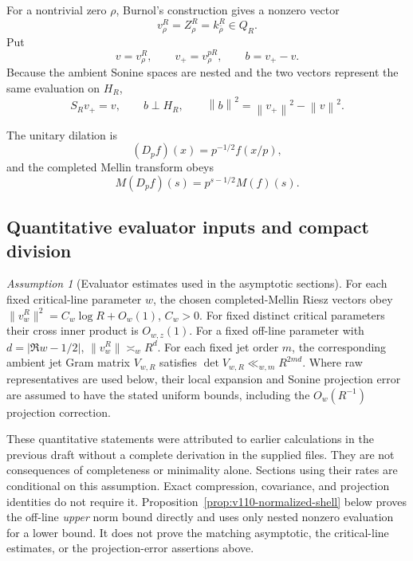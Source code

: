 \documentclass[11pt]{article}
\theoremstyle{remark}
\newcommand{\norm}[1]{\left\lVert #1\right\rVert}
\newtheorem{assumption}[theorem]{Assumption}
\begin{document}
For a nontrivial zero $\rho$, Burnol's construction gives a nonzero vector
\[
 v_\rho^R=Z_\rho^R=k_{\bar\rho}^R\in Q_R.
\]
Put
\[
 v=v_\rho^R,\qquad v_+=v_\rho^{pR},\qquad b=v_+-v.
\]
Because the ambient Sonine spaces are nested and the two vectors represent the same evaluation on $H_R$,
\begin{equation}\label{eq:nested}
 S_Rv_+=v,\qquad b\perp H_R,\qquad
 \norm b^2=\norm{v_+}^2-\norm v^2.
\end{equation}

The unitary dilation is
\[
 (D_pf)(x)=p^{-1/2}f(x/p),
\]
and the completed Mellin transform obeys
\[
 M(D_pf)(s)=p^{s-1/2}M(f)(s).
\]

\subsection*{Quantitative evaluator inputs and compact division}
\begin{assumption}[Evaluator estimates used in the asymptotic sections]\label{ass:evaluators}
For each fixed critical-line parameter $w$, the chosen completed-Mellin
Riesz vectors obey $\|v_w^R\|^2=C_w\log R+O_w(1)$, $C_w>0$.
For fixed distinct critical parameters their cross inner product is
$O_{w,z}(1)$. For a fixed off-line parameter with
$d=|\Re w-1/2|$, $\|v_w^R\|\asymp_w R^d$.
For each fixed jet order $m$, the corresponding ambient jet Gram matrix
$V_{w,R}$ satisfies $\det V_{w,R}\ll_{w,m}R^{2md}$.
Where raw representatives are used below, their local expansion and
Sonine projection error are assumed to have the stated uniform bounds,
including the $O_w(R^{-1})$ projection correction.
\end{assumption}
These quantitative statements were attributed to earlier calculations in
the previous draft without a complete derivation in the supplied files.
They are not consequences of completeness or minimality alone. Sections
using their rates are conditional on this assumption. Exact compression,
covariance, and projection identities do not require it.
Proposition~\ref{prop:v110-normalized-shell} below proves the off-line
\emph{upper} norm bound directly and uses only nested nonzero evaluation
for a lower bound. It does not prove the matching asymptotic, the
critical-line estimates, or the projection-error assertions above.
\end{document}
